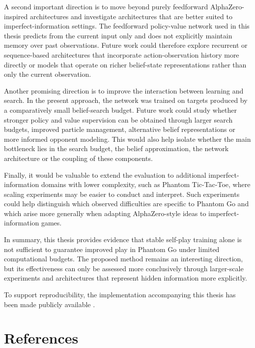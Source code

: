 \documentclass[12pt,oneside,openright]{article}
\begin{document}
A second important direction is to move beyond purely feedforward AlphaZero-inspired architectures and investigate architectures that are better suited to imperfect-information settings. The feedforward policy-value network used in this thesis predicts from the current input only and does not explicitly maintain memory over past observations. Future work could therefore explore recurrent or sequence-based architectures that incorporate action-observation history more directly or models that operate on richer belief-state representations rather than only the current observation.

Another promising direction is to improve the interaction between learning and search. In the present approach, the network was trained on targets produced by a comparatively small belief-search budget. Future work could study whether stronger policy and value supervision can be obtained through larger search budgets, improved particle management, alternative belief representations or more informed opponent modeling. This would also help isolate whether the main bottleneck lies in the search budget, the belief approximation, the network architecture or the coupling of these components.

Finally, it would be valuable to extend the evaluation to additional imperfect-information domains with lower complexity, such as Phantom Tic-Tac-Toe, where scaling experiments may be easier to conduct and interpret. Such experiments could help distinguish which observed difficulties are specific to Phantom Go and which arise more generally when adapting AlphaZero-style ideas to imperfect-information games.

In summary, this thesis provides evidence that stable self-play training alone is not sufficient to guarantee improved play in Phantom Go under limited computational budgets. The proposed method remains an interesting direction, but its effectiveness can only be assessed more conclusively through larger-scale experiments and architectures that represent hidden information more explicitly.

To support reproducibility, the implementation accompanying this thesis has been made publicly available \cite{nguyen2026azbsmcts}.
\newpage

\section{References}
\printbibliography[heading=none]
\end{document}
